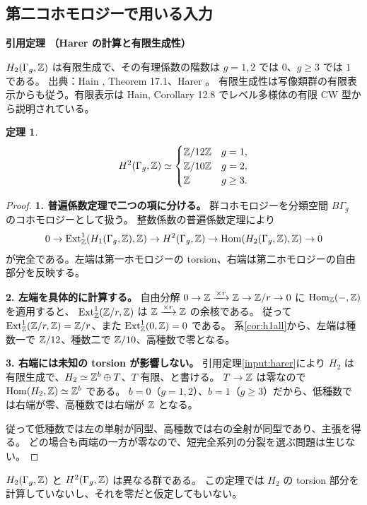 \documentclass[dvipdfmx,a4paper,11pt]{article}
\theoremstyle{definition}
\newtheorem{thm}{定理}[section]
\newenvironment{external}[1]{\Needspace{7\baselineskip}\refstepcounter{thm}\begin{tcolorbox}[mybox,colback=blue!2,colframe=blue!40!black]\textbf{引用定理 \thethm（#1）}\par}{\end{tcolorbox}}
\begin{document}
\subsection{第二コホモロジーで用いる入力}
\begin{external}{Harer の計算と有限生成性}\label{input:harer}
$H_2(\Gamma_g,\mathbb Z)$ は有限生成で、その有理係数の階数は $g=1,2$ では $0$、$g\ge3$ では $1$ である。
出典：Hain \cite{Hain}, Theorem 17.1、Harer \cite{Harer}。
有限生成性は写像類群の有限表示からも従う。有限表示は Hain, Corollary 12.8 でレベル多様体の有限 CW 型から説明されている。
\end{external}
\begin{thm}\label{thm:h2}
\[
H^2(\Gamma_g,\mathbb Z)\simeq
\begin{cases}\mathbb Z/12\mathbb Z&g=1,\\\mathbb Z/10\mathbb Z&g=2,\\\mathbb Z&g\ge3.\end{cases}
\]
\end{thm}
\begin{proof}
\textbf{1. 普遍係数定理で二つの項に分ける。}
群コホモロジーを分類空間 $B\Gamma_g$ のコホモロジーとして扱う。
整数係数の普遍係数定理により
\[
0\to\operatorname{Ext}^1_\mathbb Z(H_1(\Gamma_g,\mathbb Z),\mathbb Z)
\to H^2(\Gamma_g,\mathbb Z)
\to\operatorname{Hom}(H_2(\Gamma_g,\mathbb Z),\mathbb Z)\to0
\]
が完全である。左端は第一ホモロジーの torsion、右端は第二ホモロジーの自由部分を反映する。

\textbf{2. 左端を具体的に計算する。}
自由分解 $0\to\mathbb Z\xrightarrow{\times r}\mathbb Z\to\mathbb Z/r\to0$ に $\operatorname{Hom}_\mathbb Z(-,\mathbb Z)$ を適用すると、
$\operatorname{Ext}^1_\mathbb Z(\mathbb Z/r,\mathbb Z)$ は $\mathbb Z\xrightarrow{\times r}\mathbb Z$ の余核である。
従って $\operatorname{Ext}^1_\mathbb Z(\mathbb Z/r,\mathbb Z)=\mathbb Z/r$、また $\operatorname{Ext}^1_\mathbb Z(0,\mathbb Z)=0$ である。
系\ref{cor:h1all}から、左端は種数一で $\mathbb Z/12$、種数二で $\mathbb Z/10$、高種数で零となる。

\textbf{3. 右端には未知の torsion が影響しない。}
引用定理\ref{input:harer}により $H_2$ は有限生成で、$H_2\simeq\mathbb Z^b\oplus T$、$T$ 有限、と書ける。
$T\to\mathbb Z$ は零なので $\operatorname{Hom}(H_2,\mathbb Z)\simeq\mathbb Z^b$ である。
$b=0$（$g=1,2$）、$b=1$（$g\ge3$）だから、低種数では右端が零、高種数では右端が $\mathbb Z$ となる。

従って低種数では左の単射が同型、高種数では右の全射が同型であり、主張を得る。
どの場合も両端の一方が零なので、短完全系列の分裂を選ぶ問題は生じない。
\end{proof}
$H_2(\Gamma_g,\mathbb Z)$ と $H^2(\Gamma_g,\mathbb Z)$ は異なる群である。
この定理では $H_2$ の torsion 部分を計算していないし、それを零だと仮定してもいない。

\par\bigskip\Needspace{.70\textheight}
\end{document}
